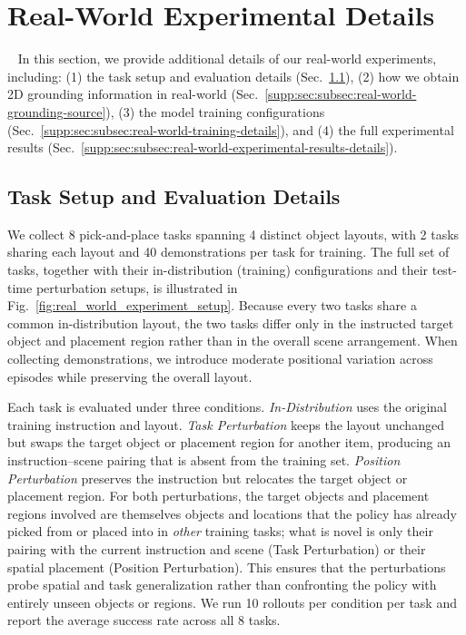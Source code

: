 \section{Real-World Experimental Details}~\label{supp:sec:real_world_setup_details}
In this section, we provide additional details of our real-world experiments, including: (1) the task setup and evaluation details (Sec.~\ref{supp:sec:subsec:real-world-task-setup}), (2) how we obtain 2D grounding information in real-world (Sec.~\ref{supp:sec:subsec:real-world-grounding-source}), (3) the model training configurations (Sec.~\ref{supp:sec:subsec:real-world-training-details}), and (4) the full experimental results (Sec.~\ref{supp:sec:subsec:real-world-experimental-results-details}).

\subsection{Task Setup and Evaluation Details}
\label{supp:sec:subsec:real-world-task-setup}

We collect 8 pick-and-place tasks spanning 4 distinct object layouts, with 2 tasks sharing each layout and 40 demonstrations per task for training. The full set of tasks, together with their in-distribution (training) configurations and their test-time perturbation setups, is illustrated in Fig.~\ref{fig:real_world_experiment_setup}. Because every two tasks share a common in-distribution layout, the two tasks differ only in the instructed target object and placement region rather than in the overall scene arrangement. When collecting demonstrations, we introduce moderate positional variation across episodes while preserving the overall layout.

Each task is evaluated under three conditions. \emph{In-Distribution} uses the original training instruction and layout. \emph{Task Perturbation} keeps the layout unchanged but swaps the target object or placement region for another item, producing an instruction–scene pairing that is absent from the training set. \emph{Position Perturbation} preserves the instruction but relocates the target object or placement region. For both perturbations, the target objects and placement regions involved are themselves objects and locations that the policy has already picked from or placed into in \emph{other} training tasks; what is novel is only their pairing with the current instruction and scene (Task Perturbation) or their spatial placement (Position Perturbation). This ensures that the perturbations probe spatial and task generalization rather than confronting the policy with entirely unseen objects or regions. We run 10 rollouts per condition per task and report the average success rate across all 8 tasks.


